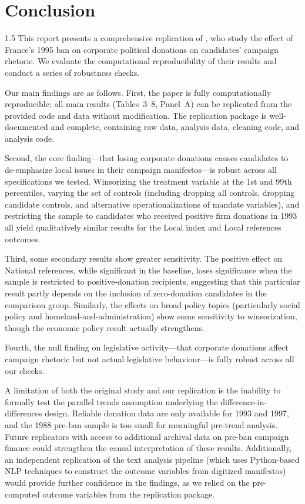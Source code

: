\documentclass[12pt,a4paper]{article}
\begin{document}
\section{Conclusion}
\begin{spacing}{1.5}
This report presents a comprehensive replication of \cite{Cage}, who study the effect of France's 1995 ban on corporate political donations on candidates' campaign rhetoric. We evaluate the computational reproducibility of their results and conduct a series of robustness checks.

Our main findings are as follows. First, the paper is fully computationally reproducible: all main results (Tables~3--8, Panel~A) can be replicated from the provided code and data without modification. The replication package is well-documented and complete, containing raw data, analysis data, cleaning code, and analysis code.

Second, the core finding---that losing corporate donations causes candidates to de-emphasize local issues in their campaign manifestos---is robust across all specifications we tested. Winsorizing the treatment variable at the 1st and 99th percentiles, varying the set of controls (including dropping all controls, dropping candidate controls, and alternative operationalizations of mandate variables), and restricting the sample to candidates who received positive firm donations in 1993 all yield qualitatively similar results for the Local index and Local references outcomes.

Third, some secondary results show greater sensitivity. The positive effect on National references, while significant in the baseline, loses significance when the sample is restricted to positive-donation recipients, suggesting that this particular result partly depends on the inclusion of zero-donation candidates in the comparison group. Similarly, the effects on broad policy topics (particularly social policy and homeland-and-administration) show some sensitivity to winsorization, though the economic policy result actually strengthens.

Fourth, the null finding on legislative activity---that corporate donations affect campaign rhetoric but not actual legislative behaviour---is fully robust across all our checks.

A limitation of both the original study and our replication is the inability to formally test the parallel trends assumption underlying the difference-in-differences design. Reliable donation data are only available for 1993 and 1997, and the 1988 pre-ban sample is too small for meaningful pre-trend analysis. Future replicators with access to additional archival data on pre-ban campaign finance could strengthen the causal interpretation of these results. Additionally, an independent replication of the text analysis pipeline (which uses Python-based NLP techniques to construct the outcome variables from digitized manifestos) would provide further confidence in the findings, as we relied on the pre-computed outcome variables from the replication package.


\end{spacing}
\end{document}
